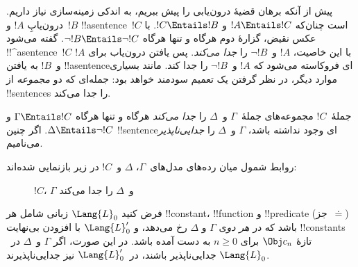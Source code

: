 \documentclass[../../../include/open-logic-section]{subfiles}
\begin{document}


پیش از آنکه برهان قضیهٔ درون‌یابی را پیش ببریم، به اندکی زمینه‌سازی
نیاز داریم. درون‌یابِ $!A$ و~$!B$ !!a{sentence}~$!C$ است چنان‌که
$!A \Entails !C$ و $!C \Entails !B$. با عکس نقیض، گزارهٔ دوم هرگاه و
تنها هرگاه $\lnot !B \Entails \lnot !C$. گفته می‌شود
!!^a{sentence}~$!C$ با این خاصیت، $!A$ و~$\lnot !B$ را
\emph{جدا می‌کند}. پس یافتن درون‌یاب برای $!A$ و~$!B$ به یافتن
!!a{sentence}ای فروکاسته می‌شود که $!A$ و~$\lnot !B$ را جدا کند.
مانند بسیاری موارد دیگر، در نظر گرفتن یک تعمیم سودمند خواهد بود:
جمله‌ای که دو \emph{مجموعه} از !!{sentence}s را جدا می‌کند.

\begin{defn}
جملهٔ~$!C$ مجموعه‌های جملهٔ~$\Gamma$ و~$\Delta$ را \emph{جدا می‌کند}
هرگاه و تنها هرگاه $\Gamma \Entails !C$ و
$\Delta \Entails \lnot !C$. اگر چنین !!{sentence}ای وجود نداشته
باشد، $\Gamma$ و~$\Delta$ را \emph{جدایی‌ناپذیر} می‌نامیم.
\end{defn}

روابط شمول میان رده‌های مدل‌های~$\Gamma$، $\Delta$ و~$!C$ در زیر
بازنمایی شده‌اند:
\begin{figure}[h]
  \centering
  \caption{$!C$، $\Gamma$ و~$\Delta$ را جدا می‌کند}
\end{figure}


\begin{lem}
فرض کنید $\Lang{L}_0$ زبانی شامل هر !!{constant}، !!{function} و
!!{predicate} (جز~$\doteq$) باشد که در \emph{هر دو}ی $\Gamma$ و
$\Delta$ رخ می‌دهد، و $\Lang{L}'_0$ با افزودن بی‌نهایت
!!{constant}s تازهٔ $\Obj c_n$ برای $n \ge 0$ به دست آمده باشد. در
این صورت، اگر $\Gamma$ و~$\Delta$ در~$\Lang{L}_0$ جدایی‌ناپذیر باشند،
در~$\Lang{L}'_0$ نیز جدایی‌ناپذیرند.
\end{lem}
\end{document}
